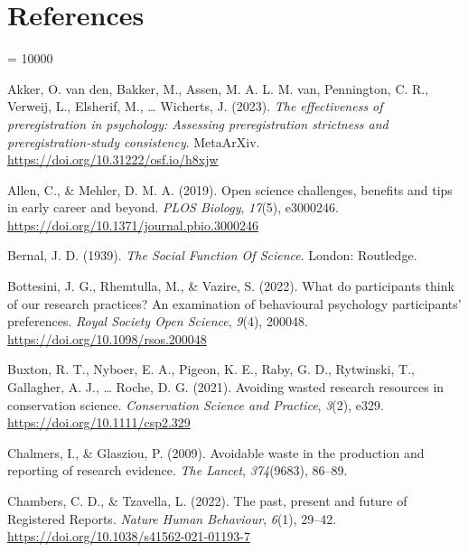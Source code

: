 \documentclass[
  ,jou, a4paper,floatsintext]{apa6}
\newlength{\cslhangindent}
\newlength{\cslentryspacingunit} %
\newenvironment{CSLReferences}[2] %
 {%
  \setlength{\parindent}{0pt}
  \ifodd #1
  \let\oldpar\par
  \def\par{\hangindent=\cslhangindent\oldpar}
  \fi
  \setlength{\parskip}{#2\cslentryspacingunit}
 }%
 {}
\begin{document}
\hypertarget{references}{%
\section{References}\label{references}}

\begingroup

\interlinepenalty = 10000

\hypertarget{refs}{}
\begin{CSLReferences}{1}{0}
\leavevmode{}%
Akker, O. van den, Bakker, M., Assen, M. A. L. M. van, Pennington, C. R., Verweij, L., Elsherif, M., \ldots{} Wicherts, J. (2023). \emph{The effectiveness of preregistration in psychology: {Assessing} preregistration strictness and preregistration-study consistency}. {MetaArXiv}. \url{https://doi.org/10.31222/osf.io/h8xjw}

\leavevmode{}%
Allen, C., \& Mehler, D. M. A. (2019). Open science challenges, benefits and tips in early career and beyond. \emph{PLOS Biology}, \emph{17}(5), e3000246. \url{https://doi.org/10.1371/journal.pbio.3000246}

\leavevmode{}%
Bernal, J. D. (1939). \emph{The {Social Function Of Science}}. {London}: {Routledge}.

\leavevmode{}%
Bottesini, J. G., Rhemtulla, M., \& Vazire, S. (2022). What do participants think of our research practices? {An} examination of behavioural psychology participants' preferences. \emph{Royal Society Open Science}, \emph{9}(4), 200048. \url{https://doi.org/10.1098/rsos.200048}

\leavevmode{}%
Buxton, R. T., Nyboer, E. A., Pigeon, K. E., Raby, G. D., Rytwinski, T., Gallagher, A. J., \ldots{} Roche, D. G. (2021). Avoiding wasted research resources in conservation science. \emph{Conservation Science and Practice}, \emph{3}(2), e329. \url{https://doi.org/10.1111/csp2.329}

\leavevmode{}%
Chalmers, I., \& Glasziou, P. (2009). Avoidable waste in the production and reporting of research evidence. \emph{The Lancet}, \emph{374}(9683), 86--89.

\leavevmode{}%
Chambers, C. D., \& Tzavella, L. (2022). The past, present and future of {Registered Reports}. \emph{Nature Human Behaviour}, \emph{6}(1), 29--42. \url{https://doi.org/10.1038/s41562-021-01193-7}


\end{CSLReferences}
\end{document}

